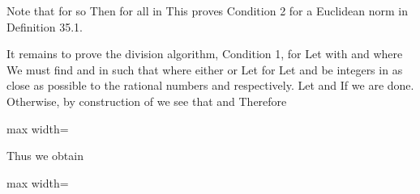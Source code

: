 \documentclass[11pt,oneside]{article}
\begin{document}
\begin{BookBody}
 Note that for  so  Then for all  in  This proves Condition 2 for a Euclidean norm in Definition 35.1.

It remains to prove the division algorithm, Condition 1, for  Let  with  and  where  We must find \BookInline{\sigma } and \BookInline{\rho } in  such that \BookInline{\alpha = \beta \sigma + \rho,\allowbreak } where either  or  Let  for  Let  and  be integers in  as close as possible to the rational numbers  and  respectively. Let  and  If  we are done. Otherwise, by construction of \BookInline{\sigma,\allowbreak } we see that  and  Therefore

\begin{center}\begin{adjustbox}{max width=\linewidth}\end{adjustbox}\end{center}

\noindent Thus we obtain

\begin{center}\begin{adjustbox}{max width=\linewidth}\end{adjustbox}\end{center}


\end{BookBody}
\end{document}
